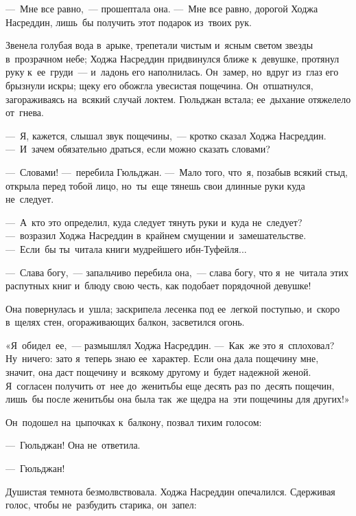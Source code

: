 \documentclass[12pt,a4paper]{book}
\begin{document}
—~Мне все равно,~— прошептала она. —~Мне все равно, дорогой Ходжа Насреддин, лишь~бы получить этот подарок из~твоих рук.

Звенела голубая вода в~арыке, трепетали чистым и~ясным светом звезды в~прозрачном небе; Ходжа Насреддин придвинулся ближе к~девушке, протянул руку к~ее~груди~— и~ладонь его наполнилась. Он~замер, но~вдруг из~глаз его брызнули искры; щеку его обожгла увесистая пощечина. Он~отшатнулся, загораживаясь на~всякий случай локтем. Гюльджан встала; ее~дыхание отяжелело от~гнева.

—~Я, кажется, слышал звук пощечины,~— кротко сказал Ходжа Насреддин. —~И~зачем обязательно драться, если можно сказать словами?

—~Словами! —~перебила Гюльджан. —~Мало того, что~я, позабыв всякий стыд, открыла перед тобой лицо, но~ты~еще тянешь свои длинные руки куда не~следует.

—~А~кто это определил, куда следует тянуть руки и~куда не~следует? —~возразил Ходжа Насреддин в~крайнем смущении и~замешательстве. —~Если~бы ты~читала книги мудрейшего ибн-Туфейля...

—~Слава богу,~— запальчиво перебила она,~— слава богу, что я~не~читала этих распутных книг и~блюду свою честь, как подобает порядочной девушке!

Она повернулась и~ушла; заскрипела лесенка под ее~легкой поступью, и~скоро в~щелях стен, огораживающих балкон, засветился огонь.

«Я~обидел~ее,~— размышлял Ходжа Насреддин. —~Как~же это я~сплоховал? Ну~ничего: зато я~теперь знаю ее~характер. Если она дала пощечину мне, значит, она даст пощечину и~всякому другому и~будет надежной женой. Я~согласен получить от~нее до~женитьбы еще десять раз по~десять пощечин, лишь~бы после женитьбы она была так~же щедра на~эти пощечины для других!»

Он~подошел на~цыпочках к~балкону, позвал тихим голосом:

—~Гюльджан! Она не~ответила.

—~Гюльджан!

Душистая темнота безмолвствовала. Ходжа Насреддин опечалился. Сдерживая голос, чтобы не~разбудить старика, он~запел:
\end{document}
